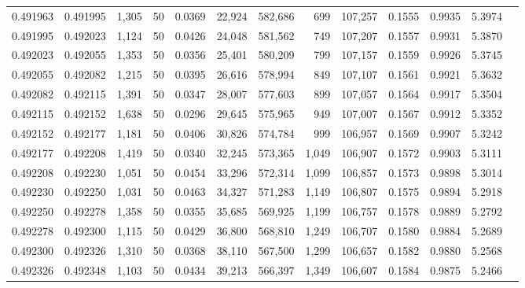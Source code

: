 \begin{tabular}{rrrrrrrrrrrrr}
0.491963 & 0.491995 & 1,305 &  50 &                                     0.0369 &  22,924 & 582,686 &     699 & 107,257 & 0.1555 & 0.9935 & 5.3974 \\
0.491995 & 0.492023 & 1,124 &  50 &                                     0.0426 &  24,048 & 581,562 &     749 & 107,207 & 0.1557 & 0.9931 & 5.3870 \\
0.492023 & 0.492055 & 1,353 &  50 &                                     0.0356 &  25,401 & 580,209 &     799 & 107,157 & 0.1559 & 0.9926 & 5.3745 \\
0.492055 & 0.492082 & 1,215 &  50 &                                     0.0395 &  26,616 & 578,994 &     849 & 107,107 & 0.1561 & 0.9921 & 5.3632 \\
0.492082 & 0.492115 & 1,391 &  50 &                                     0.0347 &  28,007 & 577,603 &     899 & 107,057 & 0.1564 & 0.9917 & 5.3504 \\
0.492115 & 0.492152 & 1,638 &  50 &                                     0.0296 &  29,645 & 575,965 &     949 & 107,007 & 0.1567 & 0.9912 & 5.3352 \\
0.492152 & 0.492177 & 1,181 &  50 &                                     0.0406 &  30,826 & 574,784 &     999 & 106,957 & 0.1569 & 0.9907 & 5.3242 \\
0.492177 & 0.492208 & 1,419 &  50 &                                     0.0340 &  32,245 & 573,365 &   1,049 & 106,907 & 0.1572 & 0.9903 & 5.3111 \\
0.492208 & 0.492230 & 1,051 &  50 &                                     0.0454 &  33,296 & 572,314 &   1,099 & 106,857 & 0.1573 & 0.9898 & 5.3014 \\
0.492230 & 0.492250 & 1,031 &  50 &                                     0.0463 &  34,327 & 571,283 &   1,149 & 106,807 & 0.1575 & 0.9894 & 5.2918 \\
0.492250 & 0.492278 & 1,358 &  50 &                                     0.0355 &  35,685 & 569,925 &   1,199 & 106,757 & 0.1578 & 0.9889 & 5.2792 \\
0.492278 & 0.492300 & 1,115 &  50 &                                     0.0429 &  36,800 & 568,810 &   1,249 & 106,707 & 0.1580 & 0.9884 & 5.2689 \\
0.492300 & 0.492326 & 1,310 &  50 &                                     0.0368 &  38,110 & 567,500 &   1,299 & 106,657 & 0.1582 & 0.9880 & 5.2568 \\
0.492326 & 0.492348 & 1,103 &  50 &                                     0.0434 &  39,213 & 566,397 &   1,349 & 106,607 & 0.1584 & 0.9875 & 5.2466 \\

\end{tabular}
